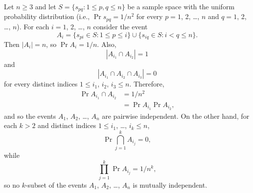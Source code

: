 \starred
Let $n\ge3$ and let $S=\{s_{pq}:1\le p,q\le n\}$ be a sample space with the uniform probability distribution (i.e., $\Pr{s_{pq}}=1/n^2$ for every $p=1$, 2, \dots, $n$ and $q=1$, 2, \dots, $n$).
For each $i=1$, 2, \dots, $n$ consider the event
\[
    A_i = \{s_{pi}\in S:1\le p\le i\}\cup\{s_{iq}\in S:i<q\le n\}.
\]
Then $|A_i|=n$, so $\Pr{A_i}=1/n$.
Also,
\[
    |A_{i_1}\cap A_{i_2}| = 1
\]
and
\[
    |A_{i_1}\cap A_{i_2}\cap A_{i_3}| = 0
\]
for every distinct indices $1\le i_1$, $i_2$, $i_3\le n$.
Therefore,
\begin{align*}
    \Pr{A_{i_1}\cap A_{i_2}} &= 1/n^2 \\
    &= \Pr{A_{i_1}}\Pr{A_{i_2}},
\end{align*}
and so the events $A_1$, $A_2$, \dots, $A_n$ are pairwise independent.
On the other hand, for each $k>2$ and distinct indices $1\le i_1$, \dots, $i_k\le n$,
\[
    \Pr{\bigcap_{j=1}^kA_{i_j}} = 0,
\]
while
\[
    \prod_{j=1}^k\Pr{A_{i_j}} = 1/n^k,
\]
so no $k$-subset of the events $A_1$, $A_2$, \dots, $A_n$ is mutually independent.
